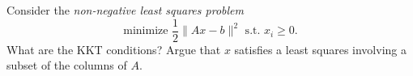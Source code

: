 \documentclass[12pt, leqno]{article}
\begin{document}

Consider the {\em non-negative least squares problem}
\[
  \mbox{minimize } \frac{1}{2} \|Ax-b\|^2 \mbox{ s.t.~} x_{i} \geq 0.
\]
What are the KKT conditions?  Argue that $x$ satisfies a least squares
involving a subset of the columns of $A$.
\end{document}
